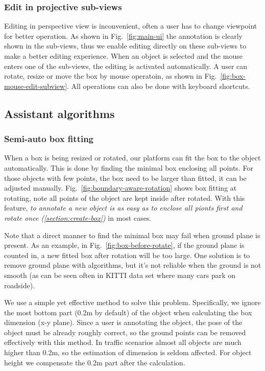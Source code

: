 \documentclass[letterpaper, 10 pt, conference]{ieeeconf}  %
\begin{document}
\subsubsection{Edit in projective sub-views}
Editing in perspective view is inconvenient, often a user has to change viewpoint for better operation. As shown in Fig.~\ref{fig:main-ui} the annotation is clearly shown in the sub-views, thus we enable editing directly on these sub-views to make a better editing experience. When an object is selected and the mouse enters one of the sub-views, the editing is activated automatically. A user can rotate, resize or move the box by mouse operatoin, as shown in Fig.~\ref{fig:box-mouse-edit-subview}.
All operations can also be done with keyboard shortcuts.



\subsection{Assistant algorithms}


\subsubsection{Semi-auto box fitting}

When a box is being resized or rotated, our platform can fit the box to the object automatically. This is done by finding the minimal box enclosing all points. For those objects with few points, the box need to be larger than fitted, it can be adjusted manually. Fig.~\ref{fig:boundary-aware-rotation} shows box fitting at rotating, note all points of the object are kept inside after rotated. With this feature, \emph{to annotate a new object is as easy as to enclose all pionts first and rotate once (\ref{section:create-box})} in most cases.

Note that a direct manner to find the minimal box may fail when ground plane is present. As an example, in Fig.~\ref{fig:box-before-rotate}, if the ground plane is counted in, a new fitted box after rotation will be too large. One solution is to remove ground plane with algorithms, but it's not reliable when the ground is not smooth (as can be seen often in KITTI data set\cite{Geiger2012CVPR} where many cars park on roadside).

We use a simple yet effective method to solve this problem. Specifically, we  ignore the most bottom part (0.2m by default) of the object when calculating the box dimension (x-y plane). Since a user is annotating the object, the pose of the object must be already roughly correct, so the  ground points can be removed effectively with this method. In traffic scenarios almost all objects are much higher than 0.2m, so the estimation of dimension is  seldom affected. For object height we compensate the 0.2m part after the calculation. 
\end{document}
